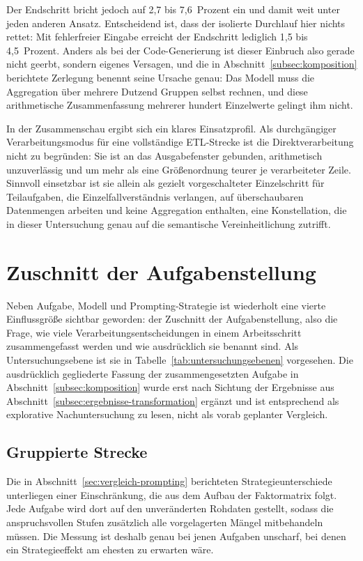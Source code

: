 Der Endschritt bricht jedoch auf 2,7 bis 7,6~Prozent ein und damit weit unter jeden anderen Ansatz. Entscheidend ist, dass der isolierte Durchlauf hier nichts rettet: Mit fehlerfreier Eingabe erreicht der Endschritt lediglich 1,5 bis 4,5~Prozent. Anders als bei der Code-Generierung ist dieser Einbruch also gerade nicht geerbt, sondern eigenes Versagen, und die in Abschnitt~\ref{subsec:komposition} berichtete Zerlegung benennt seine Ursache genau: Das Modell muss die Aggregation über mehrere Dutzend Gruppen selbst rechnen, und diese arithmetische Zusammenfassung mehrerer hundert Einzelwerte gelingt ihm nicht.

In der Zusammenschau ergibt sich ein klares Einsatzprofil. Als durchgängiger Verarbeitungsmodus für eine vollständige \ac{ETL}-Strecke ist die Direktverarbeitung nicht zu begründen: Sie ist an das Ausgabefenster gebunden, arithmetisch unzuverlässig und um mehr als eine Größenordnung teurer je verarbeiteter Zeile. Sinnvoll einsetzbar ist sie allein als gezielt vorgeschalteter Einzelschritt für Teilaufgaben, die Einzelfallverständnis verlangen, auf überschaubaren Datenmengen arbeiten und keine Aggregation enthalten, eine Konstellation, die in dieser Untersuchung genau auf die semantische Vereinheitlichung zutrifft.

\section{Zuschnitt der Aufgabenstellung}
\label{sec:zuschnitt}

Neben Aufgabe, Modell und Prompting-Strategie ist wiederholt eine vierte Einflussgröße sichtbar geworden: der Zuschnitt der Aufgabenstellung, also die Frage, wie viele Verarbeitungsentscheidungen in einem Arbeitsschritt zusammengefasst werden und wie ausdrücklich sie benannt sind. Als Untersuchungsebene ist sie in Tabelle~\ref{tab:untersuchungsebenen} vorgesehen. Die ausdrücklich gegliederte Fassung der zusammengesetzten Aufgabe in Abschnitt~\ref{subsec:komposition} wurde erst nach Sichtung der Ergebnisse aus Abschnitt~\ref{subsec:ergebnisse-transformation} ergänzt und ist entsprechend als explorative Nachuntersuchung zu lesen, nicht als vorab geplanter Vergleich.

\subsection{Gruppierte Strecke}
\label{subsec:gruppen}

Die in Abschnitt~\ref{sec:vergleich-prompting} berichteten Strategieunterschiede unterliegen einer Einschränkung, die aus dem Aufbau der Faktormatrix folgt. Jede Aufgabe wird dort auf den unveränderten Rohdaten gestellt, sodass die anspruchsvollen Stufen zusätzlich alle vorgelagerten Mängel mitbehandeln müssen. Die Messung ist deshalb genau bei jenen Aufgaben unscharf, bei denen ein Strategieeffekt am ehesten zu erwarten wäre.


